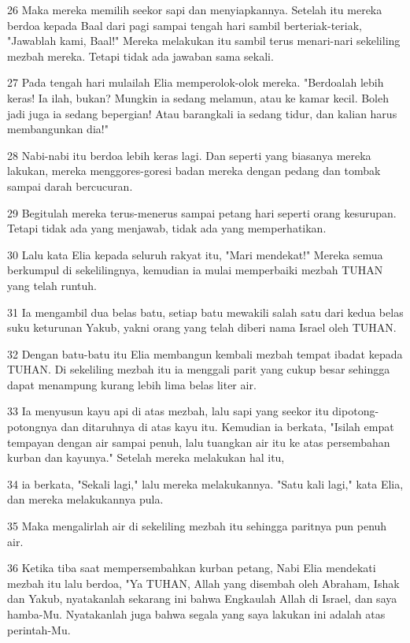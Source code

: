 \par 26 Maka mereka memilih seekor sapi dan menyiapkannya. Setelah itu mereka berdoa kepada Baal dari pagi sampai tengah hari sambil berteriak-teriak, "Jawablah kami, Baal!" Mereka melakukan itu sambil terus menari-nari sekeliling mezbah mereka. Tetapi tidak ada jawaban sama sekali.
\par 27 Pada tengah hari mulailah Elia memperolok-olok mereka. "Berdoalah lebih keras! Ia ilah, bukan? Mungkin ia sedang melamun, atau ke kamar kecil. Boleh jadi juga ia sedang bepergian! Atau barangkali ia sedang tidur, dan kalian harus membangunkan dia!"
\par 28 Nabi-nabi itu berdoa lebih keras lagi. Dan seperti yang biasanya mereka lakukan, mereka menggores-goresi badan mereka dengan pedang dan tombak sampai darah bercucuran.
\par 29 Begitulah mereka terus-menerus sampai petang hari seperti orang kesurupan. Tetapi tidak ada yang menjawab, tidak ada yang memperhatikan.
\par 30 Lalu kata Elia kepada seluruh rakyat itu, "Mari mendekat!" Mereka semua berkumpul di sekelilingnya, kemudian ia mulai memperbaiki mezbah TUHAN yang telah runtuh.
\par 31 Ia mengambil dua belas batu, setiap batu mewakili salah satu dari kedua belas suku keturunan Yakub, yakni orang yang telah diberi nama Israel oleh TUHAN.
\par 32 Dengan batu-batu itu Elia membangun kembali mezbah tempat ibadat kepada TUHAN. Di sekeliling mezbah itu ia menggali parit yang cukup besar sehingga dapat menampung kurang lebih lima belas liter air.
\par 33 Ia menyusun kayu api di atas mezbah, lalu sapi yang seekor itu dipotong-potongnya dan ditaruhnya di atas kayu itu. Kemudian ia berkata, "Isilah empat tempayan dengan air sampai penuh, lalu tuangkan air itu ke atas persembahan kurban dan kayunya." Setelah mereka melakukan hal itu,
\par 34 ia berkata, "Sekali lagi," lalu mereka melakukannya. "Satu kali lagi," kata Elia, dan mereka melakukannya pula.
\par 35 Maka mengalirlah air di sekeliling mezbah itu sehingga paritnya pun penuh air.
\par 36 Ketika tiba saat mempersembahkan kurban petang, Nabi Elia mendekati mezbah itu lalu berdoa, "Ya TUHAN, Allah yang disembah oleh Abraham, Ishak dan Yakub, nyatakanlah sekarang ini bahwa Engkaulah Allah di Israel, dan saya hamba-Mu. Nyatakanlah juga bahwa segala yang saya lakukan ini adalah atas perintah-Mu.
